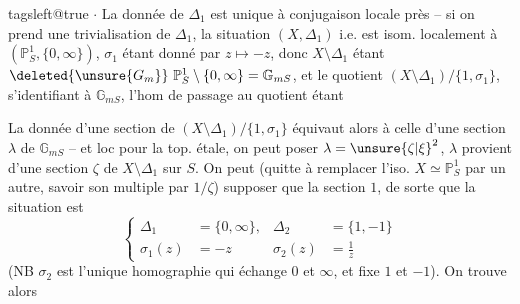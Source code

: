 \begingroup\csname tagsleft@true\endcsname
\(\cdot\) La donnée de \(\Delta_1\) est unique à conjugaison locale près -- si on prend une trivialisation de  \(\Delta_1\),  la situation \((X,\Delta_1)\) i.e.  est isom. localement à \((\mathbb P^1_S,\{0,\infty\})\), \(\sigma_1\) étant donné par \(z\mapsto-z\), donc \(X\setminus\Delta_1\) étant \(\deleted{\unsure{G_m}}\ \mathbb P^1_S\setminus\{0,\infty\}=\mathbb G_{mS}\), et le quotient \((X\setminus\Delta_1)/\{1,\sigma_1\}\), s'identifiant à \(\mathbb G_{mS}\), l'hom de passage au quotient étant

La donnée d'une section de \((X\setminus\Delta_1)/\{1,\sigma_1\}\) équivaut alors à celle d'une section \(\lambda\) de \(\mathbb G_{mS}\) -- et loc pour la top. étale, on peut poser \(\lambda=\unsure{\zeta|\xi}^2\),    \(\lambda\) provient d'une section \(\zeta\) de \(X\setminus\Delta_1\) sur \(S\). On peut (quitte à remplacer l'iso. \(X\simeq\mathbb P^1_S\) par un autre, savoir son multiple par \(1/\zeta\)) supposer que  la section \(1\), de sorte que la situation  est
\[
\left\{\begin{aligned}
\Delta_1&=\{0,\infty\},&\Delta_2&=\{1,-1\}\\
\sigma_1(z)&=-z&\sigma_2(z)&=\frac1z
\end{aligned}\right. \tag*{(4)}
\]
(NB \(\sigma_2\) est l'unique homographie qui échange \(0\) et \(\infty\), et fixe \(1\) et \(-1\)). On trouve alors
\endgroup
